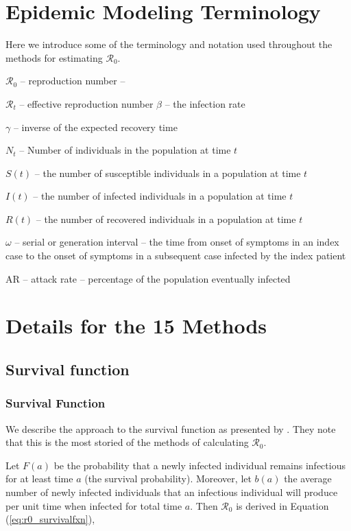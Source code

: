 \documentclass[12pt]{article}
\newcommand{\XX}{15 } %
\newcommand{\rr}{\ensuremath{\mathcal{R}_0}}
\begin{document}
\section{Epidemic Modeling Terminology}
\label{sec:term}

Here we introduce some of the terminology and notation used throughout the methods for estimating \rr.

{$\rr$} -- reproduction number -- 

{$\mathcal{R}_t$} -- effective reproduction number
{$\beta$} -- the infection rate

{$\gamma$} -- inverse of the expected recovery time

{$N_t$} -- Number of individuals in the population at time $t$

{$S(t)$} -- the number of susceptible individuals in a population at time $t$

{$I(t)$} -- the number of infected individuals in a population at time $t$

{$R(t)$} -- the number of recovered individuals in a population at time $t$

{$\omega$} -- serial or generation interval -- the time from onset of symptoms in an index case to the onset of symptoms in a subsequent case infected by the index patient

AR -- attack rate -- percentage of the population eventually infected



\section{Details for the \XX Methods}
\label{sec:details}
\subsection{Survival function}
\label{sec:direct}
\subsubsection{Survival Function}
\label{sec:survival_fxn}
We describe the approach to the survival function as presented by \cite{Heffernan2005}.  They note that this is the most storied of the methods of calculating $\rr$.

Let $F(a)$ be the probability that a newly infected individual remains infectious for at least time $a$ (the survival probability).  Moreover, let $b(a)$ the average number of newly infected individuals that an infectious individual will produce per unit time when infected for total time $a$.  Then $\rr$ is derived in Equation (\ref{eq:r0_survivalfxn}),
\end{document}
